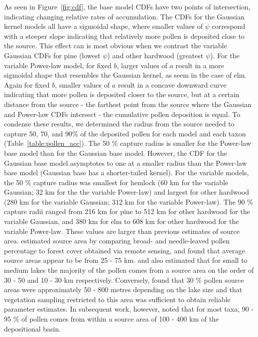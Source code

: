 \documentclass[12pt]{article}
\begin{document}
As seen in Figure~\ref{fig:cdf}, the base model CDFs have two points
of intersection, indicating changing relative rates of
accumulation. The CDFs for the Gaussian kernel models all have a
sigmoidal shape, where smaller values of $\psi$ correspond with a
steeper slope indicating that relatively more pollen is deposited
close to the source. This effect can is most obvious when we contrast
the variable Gaussian CDFs for pine (lowest $\psi$) and other hardwood
(greatest $\psi$). For the variable Power-law model, for fixed $b$,
larger values of $a$ result in a more sigmoidal shape that resembles
the Gaussian kernel, as seem in the case of elm. Again for fixed $b$,
smaller values of $a$ result in a concave downward curve indicating
that more pollen is deposited closer to the source, but at a certain
distance from the source - the farthest point from the source where
the Gaussian and Power-law CDFs intersect - the cumulative pollen
deposition is equal. To condense these results, we determined the
radius from the source needed to capture 50, 70, and 90\% of the
deposited pollen for each model and each taxon
(Table~\ref{table:pollen_acc}). The 50 \% capture radius is smaller
for the Power-law base model than for the Gaussian base
model. However, the CDF for the Gaussian base model asymptotes to one
at a smaller radius than the Power-law base model (Gaussian base has a
shorter-tailed kernel). For the variable models, the 50 \% capture
radius was smallest for hemlock (60 km for the variable Gaussian; 32
km for the the variable Power-law) and largest for other hardwood (280
km for the variable Gaussian; 312 km for the variable Power-law). The
90 \% capture radii ranged from 216 km for pine to 512 km for other
hardwood for the variable Gaussian, and 380 km for elm to 608 km for
other hardwood for the variable Power-law. These values are larger
than previous estimates of source
area. \citet{williams2003palynological} estimated source area by
comparing broad- and needle-leaved pollen percentage to forest cover
obtained via remote sensing, and found that average source areas
appear to be from 25 - 75 km. \citet{prentice1987quantitative} and
\citet{bradshaw1985relationships} also estimated that for small to
medium lakes the majority of the pollen comes from a source area on
the order of 30 - 50 and 10 - 30 km respectively. Conversely,
\citet{sugita1994pollen} found that 30 \% pollen source areas were
approximately 50 - 800 metres depending on the lake size and that
vegetation sampling restricted to this area was sufficient to obtain
reliable parameter estimates. In subsequent work, however,
\citet{sugita2007theory2} noted that for most taxa, 90 - 95 \% of
pollen comes from within a source area of 100 - 400 km of the
depositional basin.
\end{document}
